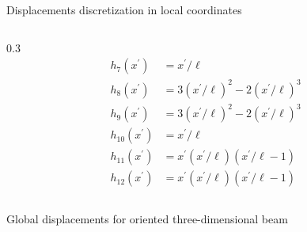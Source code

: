 \documentclass[aspectratio=169]{beamer}
\begin{document}
{\begin{frame}{Displacements discretization in local coordinates}
\begin{columns}
      \begin{column}{0.3\textwidth}
        \tiny  \begin{align*}
          h_7(x^\prime)    & = x^\prime/\ell                           \\
          h_8(x^\prime)    & =3(x^\prime/\ell)^2-2(x^\prime/\ell)^3    \\
          h_9(x^\prime)    & =3(x^\prime/\ell)^2-2(x^\prime/\ell)^3    \\
          h_{10}(x^\prime) & = x^\prime/\ell                           \\
          h_{11}(x^\prime) & =x^\prime(x^\prime/\ell)(x^\prime/\ell-1) \\
          h_{12}(x^\prime) & =x^\prime(x^\prime/\ell)(x^\prime/\ell-1)
        \end{align*}
      \end{column}
    \end{columns}
  \end{frame}


  \begin{frame}{Global displacements for oriented three-dimensional beam}
    \vspace{-0.5cm}


\end{frame}}
\end{document}
